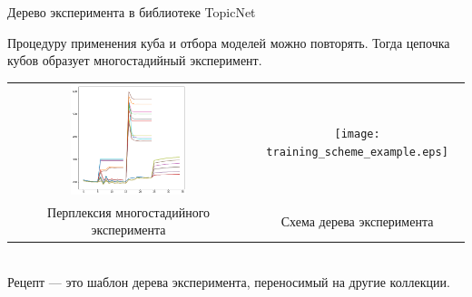 \begin{frame}[t]{Дерево эксперимента в библиотеке TopicNet}

Процедуру применения куба и отбора моделей можно повторять. Тогда цепочка кубов образует многостадийный эксперимент.

\begin{tabular}{cc}
\setlength\tabcolsep{0pt} %
\includegraphics[width=0.5\textwidth]{images/perplexity_tree.png} & 
\texttt{[image: training\_scheme\_example.eps]}
\\
\footnotesize{Перплексия многостадийного эксперимента}
     & 
\footnotesize{Схема дерева эксперимента} \end{tabular}\\
\medskip
Рецепт --- это шаблон дерева эксперимента, переносимый на другие коллекции.
\end{frame}




